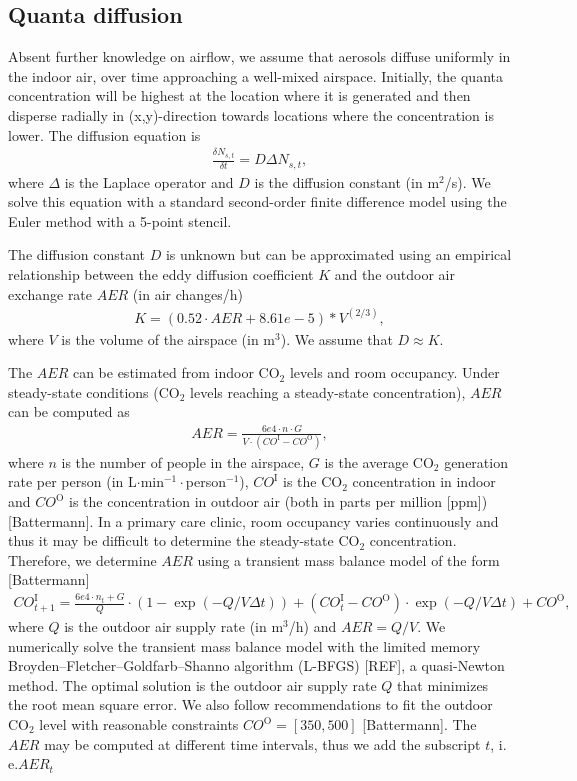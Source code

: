 \documentclass[fleqn,11pt]{wlscirep_supp}
\newcommand\ie{i.\,e.\xspace}
\begin{document}
\subsection{Quanta diffusion}\label{sec:quanta-diffusion}

Absent further knowledge on airflow, we assume that aerosols diffuse uniformly in the indoor air, over time approaching a well-mixed airspace. Initially, the quanta concentration will be highest at the location where it is generated and then disperse radially in (x,y)-direction towards locations where the concentration is lower. The diffusion equation is 
\begin{align}\label{eq:diffusion}
    \frac{\delta N_{s,t}}{\delta t} = D \Delta N_{s,t},
\end{align}
where $\Delta$ is the Laplace operator and $D$ is the diffusion constant (in m$^2$/s). We solve this equation with a standard second-order finite difference model using the Euler method with a 5-point stencil. 

The diffusion constant $D$ is unknown but can be approximated using an empirical relationship between the eddy diffusion coefficient $K$ and the outdoor air exchange rate $AER$ (in air changes/h)
\begin{align}
    K = (0.52 \cdot AER + 8.61e-5) * V^(2/3),
\end{align}
where $V$ is the volume of the airspace (in m$^3$). We assume that $D \approx K$. 

The $AER$ can be estimated from indoor CO$_2$ levels and room occupancy. Under steady-state conditions (CO$_2$ levels reaching a steady-state concentration), $AER$ can be computed as
\begin{align}
    AER = \frac{6e4 \cdot n \cdot G}{V\cdot(CO^{\text{I}}-CO^{\text{O}})},
\end{align}
where $n$ is the number of people in the airspace, $G$ is the average CO$_2$ generation rate per person (in L$\cdot$min$^{-1}\cdot$person$^{-1}$), $CO^{\text{I}}$ is the CO$_2$ concentration in indoor and $CO^{\text{O}}$ is the concentration in outdoor air (both in parts per million [ppm]) [Battermann]. In a primary care clinic, room occupancy varies continuously and thus it may be difficult to determine the steady-state CO$_2$ concentration. Therefore, we determine $AER$ using a transient mass balance model of the form [Battermann]
\begin{align}
    CO_{t+1}^{\text{I}} = \frac{6e4 \cdot n_t + G}{Q} \cdot \left(1 - \exp(-Q/V \Delta t)\right) + (CO_t^{\text{I}}-CO^{\text{O}}) \cdot \exp(-Q/V \Delta t) + CO^{\text{O}},
\end{align}
where $Q$ is the outdoor air supply rate (in m$^3$/h) and $AER = Q/V$. We numerically solve the transient mass balance model with the limited memory Broyden–Fletcher–Goldfarb–Shanno algorithm (L-BFGS) [REF], a quasi-Newton method. The optimal solution is the outdoor air supply rate $Q$ that minimizes the root mean square error. We also follow recommendations to fit the outdoor CO$_2$ level with reasonable constraints $CO^{\text{O}} = [350,500]$ [Battermann]. The $AER$ may be computed at different time intervals, thus we add the subscript $t$, \ie $AER_t$
\end{document}
